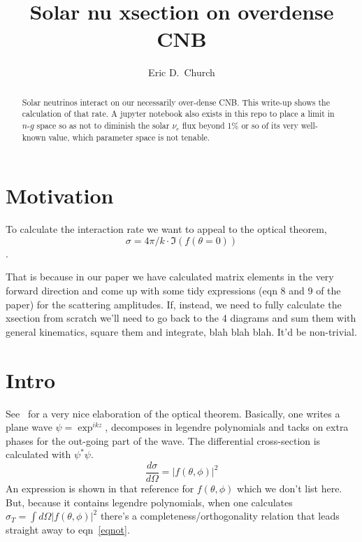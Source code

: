 \documentclass[reprint,onecolumn,superscriptaddress,preprintnumbers]{revtex4}%
\begin{document}
\title{Solar nu xsection on overdense CNB}

\author{Eric D.~Church}


\begin{abstract} 
Solar neutrinos  interact  on our necessarily over-dense CNB. This write-up shows the calculation of that rate. A jupyter notebook also exists in this repo to place a limit in $n$-$g$ space so as not to diminish the solar $\nu_e$ flux beyond 1\% or so of its very well-known value, which parameter space is not tenable.
\end{abstract}
\maketitle

\section{Motivation}

To calculate the interaction rate we want to appeal to the optical theorem, 
\begin{equation}
\sigma = 4\pi/k \cdot \Im (f(\theta=0)) \label{eqnot}
\end{equation}. 

That is because in our paper we have calculated matrix elements in the very forward direction and come up with some tidy expressions (eqn 8 and 9 of the paper) for the scattering amplitudes. If, instead, we need to fully calculate the xsection from scratch we'll need to go back to the 4 diagrams and sum them with general kinematics, square them and integrate, blah blah blah. It'd be non-trivial. 

\section{Intro}
See~\cite{optthm} for a very nice elaboration of the optical theorem. Basically, one writes a plane wave $\psi=\exp^{ikz}$, decomposes in legendre polynomials and tacks on extra phases for the out-going part of the wave. The differential cross-section is calculated with $\psi^*\psi$.
\begin{equation}
\frac{d\sigma}{d\Omega} = |f(\theta,\phi)|^2 \label{eqnf2}
\end{equation}
An expression is shown in that reference for $f(\theta,\phi)$ which we don't list here. But, because it contains legendre polynomials, when one calculates $\sigma_T = \int d\Omega |f(\theta,\phi)|^2$ there's a completeness/orthogonality relation that leads straight away to eqn~\ref{eqnot}.
\end{document}
